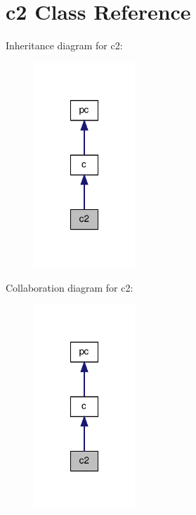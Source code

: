 \hypertarget{classc2}{\section{c2 Class Reference}
\label{classc2}
}


Inheritance diagram for c2\-:\nopagebreak
\begin{figure}[H]
\begin{center}
\leavevmode
\includegraphics[width=108pt]{classc2__inherit__graph}
\end{center}
\end{figure}


Collaboration diagram for c2\-:\nopagebreak
\begin{figure}[H]
\begin{center}
\leavevmode
\includegraphics[width=108pt]{classc2__coll__graph}
\end{center}
\end{figure}
